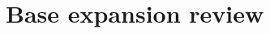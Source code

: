 \documentclass[12pt, oneside]{article}
\begin{document}
 \vfill
\section*{Base expansion review}
\end{document}
